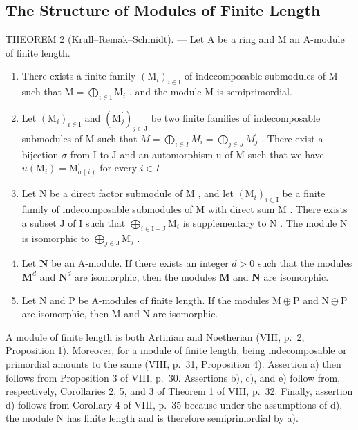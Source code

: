 \subsection{The Structure of Modules of Finite Length}

THEOREM 2 (Krull--Remak--Schmidt). --- Let A be a ring and M an A-module of finite length.

\begin{enumerate}
\def\labelenumi{\alph{enumi})}
\item
  There exists a finite family \((\mathrm{M}_i)_{i\in \mathrm{I}}\) of indecomposable submodules of M such that \(\mathrm{M} = \bigoplus_{i\in \mathrm{I}}\mathrm{M}_i\) , and the module M is semiprimordial.
\item
  Let \((\mathrm{M}_{i})_{i\in\mathrm{I}}\) and \((\mathrm{M}_{j}^{\prime})_{j\in\mathrm{J}}\) be two finite families of indecomposable submodules of M such that \(M=\bigoplus_{i\in I}M_{i}=\bigoplus_{j\in J}M_{j}^{\prime}\) . There exist a bijection \(\sigma\) from I to J and an automorphism u of M such that we have \(u(\mathrm{M}_{i})=\mathrm{M}_{\sigma(i)}^{\prime}\) for every \(i\in I\) .
\item
  Let \(\mathrm{N}\) be a direct factor submodule of \(\mathrm{M}\) , and let \((\mathrm{M}_i)_{i\in \mathrm{I}}\) be a finite family of indecomposable submodules of \(\mathrm{M}\) with direct sum \(\mathrm{M}\) . There exists a subset \(\mathrm{J}\) of \(\mathrm{I}\) such that \(\bigoplus_{i\in \mathrm{I - J}}\mathrm{M}_i\) is supplementary to \(\mathrm{N}\) . The module \(\mathrm{N}\) is isomorphic to \(\bigoplus_{j\in \mathrm{J}}\mathrm{M}_j\) .
\item
  Let \(\mathbf{N}\) be an A-module. If there exists an integer \(d > 0\) such that the modules \(\mathbf{M}^d\) and \(\mathbf{N}^d\) are isomorphic, then the modules \(\mathbf{M}\) and \(\mathbf{N}\) are isomorphic.
\item
  Let \(\mathrm{N}\) and \(\mathrm{P}\) be A-modules of finite length. If the modules \(\mathrm{M} \oplus \mathrm{P}\) and \(\mathrm{N} \oplus \mathrm{P}\) are isomorphic, then \(\mathrm{M}\) and \(\mathrm{N}\) are isomorphic.
\end{enumerate}

A module of finite length is both Artinian and Noetherian (VIII, p.~2, Proposition 1). Moreover, for a module of finite length, being indecomposable or primordial amounts to the same (VIII, p.~31, Proposition 4). Assertion a) then follows from Proposition 3 of VIII, p.~30. Assertions b), c), and e) follow from, respectively, Corollaries 2, 5, and 3 of Theorem 1 of VIII, p.~32. Finally, assertion d) follows from Corollary 4 of VIII, p.~35 because under the assumptions of d), the module N has finite length and is therefore semiprimordial by a).

